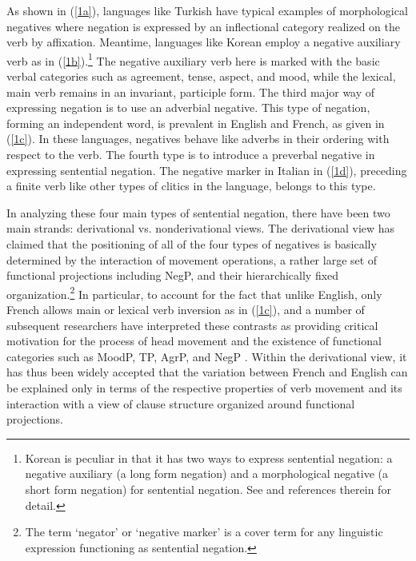 \documentclass[output=paper
                ,modfonts
                		,nonflat
	        ,collection
	        ,collectionchapter
	        ,collectiontoclongg
 	        ,biblatex
                ,babelshorthands
                ,newtxmath
                ,draftmode
                ,colorlinks, citecolor=brown
]{./langsci/langscibook}
\begin{document}
{\noindent
As shown in (\ref{1a}), languages like Turkish
have typical examples of morphological negatives where
negation is expressed by an inflectional category realized on the
verb by affixation. Meantime, languages like Korean
 employ a negative auxiliary verb as in (\ref{1b}).\footnote{Korean
 is peculiar in that it has two ways to
 express sentential negation: a negative auxiliary (a long form
 negation)  and a morphological negative (a short form negation)
 for sentential negation. See \citet{Kim:00,Kim:16} and references therein for detail.}
  The negative auxiliary
 verb here is marked with the basic verbal categories such as agreement, tense, aspect, and mood, while the lexical, main verb remains in an invariant, participle form. The third major way of expressing negation is to use an adverbial
negative. This type of negation, forming an independent word, is prevalent in English and French, as given in (\ref{1c}). In these languages, negatives behave like adverbs in their ordering with respect to the verb. The fourth
type is to introduce a preverbal negative in
expressing sentential negation. The negative marker in Italian in (\ref{1d}), preceding a finite verb like other types of clitics in the language,
belongs to this type.


In analyzing these four main types of sentential negation, there have been two main strands: derivational vs. nonderivational views. The derivational view has claimed that the positioning of all of the
four types of negatives is basically determined by the interaction of movement
operations, a rather large set of functional projections including NegP,
and their hierarchically fixed organization.\footnote{The term `negator' or `negative marker' is a cover term for any linguistic expression functioning as sentential negation.}
In particular, to account for the
fact that unlike English, only French allows main or lexical verb inversion
as in (\ref{1c}), \citet{Pollock:89,Pollock:94} and a number of subsequent researchers
have interpreted these contrasts as providing critical motivation for
the process of head movement and the existence of functional
categories such as MoodP, TP, AgrP, and NegP \citep[see]{Belletti:90, Zanuttini:91, Zanuttini:97,Zanuttini:01, Chomsky:91,Chomsky:93,Chomsky:95, Lasnik:95, Haegeman:95,Haegeman:97, Vikner97a-u, Zeijlstra:15}.
Within the derivational view, it has thus been widely
accepted that the variation between French and English can be explained only in terms of the respective properties of verb movement and its interaction with a view of clause
structure organized around functional projections.


}
\end{document}
